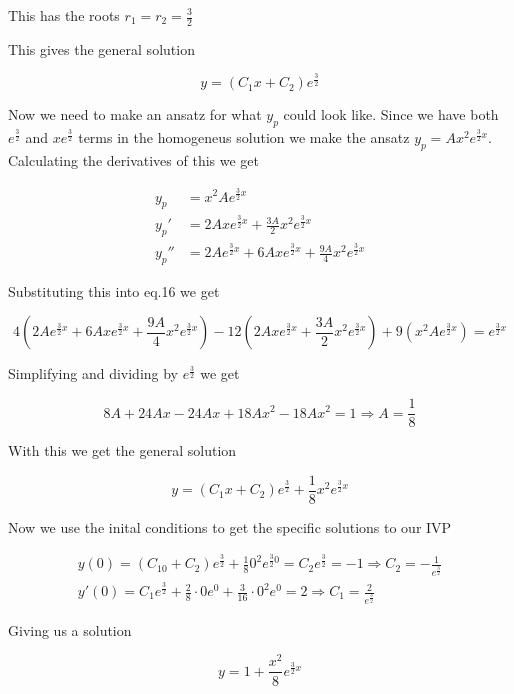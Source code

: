 \documentclass[a4paper]{article}
\begin{document}
This has the roots $r_1 = r_2 = \frac{3}{2}$

This gives the general solution

\begin{equation}
    y = (C_1x + C_2)e^{\frac{3}{2}}
\end{equation}

Now we need to make an ansatz for what $y_p$ could look like. Since we have both $e^{\frac{3}{2}}$ and $xe^{\frac{3}{2}}$ terms in the homogeneus solution we make the ansatz $y_p=Ax^2e^{\frac{3}{2}x}$. Calculating the derivatives of this we get

\begin{align}
    y_p &= x^2Ae^{\frac{3}{2}x}\\
    y_p' &= 2Axe^{\frac{3}{2}x} + \frac{3A}{2}x^2e^{\frac{3}{2}x}\\
    y_p'' &= 2Ae^{\frac{3}{2}x} + 6Axe^{\frac{3}{2}x} + \frac{9A}{4}x^2e^{\frac{3}{2}x}
\end{align}

Substituting this into eq.16 we get

\begin{equation}
    4(2Ae^{\frac{3}{2}x} + 6Axe^{\frac{3}{2}x} + \frac{9A}{4}x^2e^{\frac{3}{2}x}) - 12(2Axe^{\frac{3}{2}x} + \frac{3A}{2}x^2e^{\frac{3}{2}x}) + 9(x^2Ae^{\frac{3}{2}x}) = e^{\frac{3}{2}x}
\end{equation}

Simplifying and dividing by $e^{\frac{3}{2}}$ we get

\begin{equation}
    8A + 24Ax - 24Ax + 18Ax^2 - 18Ax^2 = 1 \Rightarrow A = \frac{1}{8}
\end{equation}

With this we get the general solution

\begin{equation}
    y = (C_1x + C_2)e^{\frac{3}{2}} + \frac{1}{8}x^2e^{\frac{3}{2}x}
\end{equation}

Now we use the inital conditions to get the specific solutions to our IVP

\begin{align}
    y(0) = (C_10 + C_2)e^{\frac{3}{2}} + \frac{1}{8}0^2e^{\frac{3}{2}0} = C_2e^{\frac{3}{2}} = -1 \Rightarrow C_2 = -\frac{1}{e^{\frac{3}{2}}}\\
    y'(0) = C_1e^{\frac{3}{2}} + \frac{2}{8} \cdot 0 e^0 + \frac{3}{16} \cdot 0^2e^0 = 2 \Rightarrow C_1 = \frac{2}{e^{\frac{3}{2}}}
\end{align}

Giving us a solution

\begin{equation}
    y = 1 + \frac{x^2}{8}e^{\frac{3}{2}x} 
\end{equation}
\end{document}
